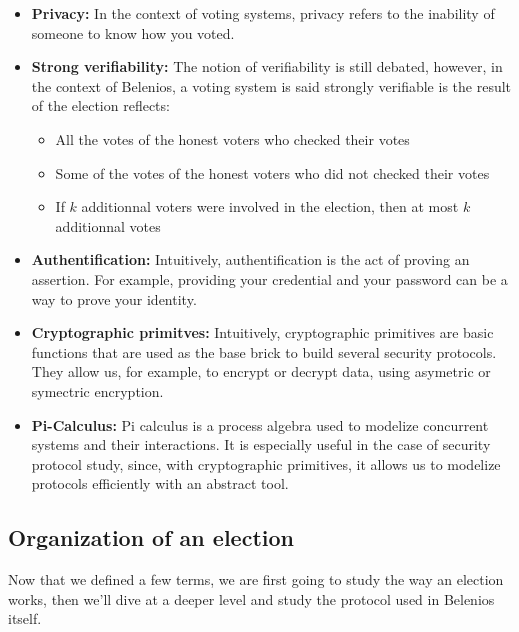 \documentclass[12pt, a4paper]{report}
\begin{document}
\begin{itemize}
\item \textbf{Privacy:} In the context of voting systems, privacy refers to the inability of 
someone to know how you voted.

\item \textbf{Strong verifiability:} The notion of verifiability is still debated, however, in the 
context of Belenios, a voting system is said strongly verifiable is the result of the election reflects:

	\begin{itemize}
	\item All the votes of the honest voters who checked their votes
	\item Some of the votes of the honest voters who did not checked their votes
	\item If $k$ additionnal voters were involved in the election, then at most $k$ additionnal votes
	\end{itemize}
	
\item \textbf{Authentification: } Intuitively, authentification is the act of proving an assertion.
For example, providing your credential and your password can be a way to prove your identity.

\item \textbf{Cryptographic primitves:} Intuitively, cryptographic primitives are basic functions 
that are used as the base brick to build several security protocols. They allow us, for example, to
encrypt or decrypt data, using asymetric or symectric encryption.

\item \textbf{Pi-Calculus:} Pi calculus is a process algebra used to modelize concurrent systems and
their interactions. It is especially useful in the case of security protocol study, since, with
cryptographic primitives, it allows us to modelize protocols efficiently with an abstract tool.

\end{itemize}

\subsection{Organization of an election}

Now that we defined a few terms, we are first going to study the way an election works, then we'll dive at a deeper level and study the protocol used in Belenios itself.
\end{document}
